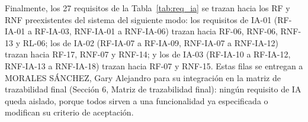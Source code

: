 \documentclass[journal,onecolumn]{IEEEtran}
\begin{document}
Finalmente, los 27 requisitos de la Tabla~\ref{tab:req_ia} se trazan hacia los RF y RNF
preexistentes del sistema del siguiente modo: los requisitos de IA-01 (RF-IA-01 a RF-IA-03,
RNF-IA-01 a RNF-IA-06) trazan hacia RF-06, RNF-06, RNF-13 y RL-06; los de IA-02 (RF-IA-07 a
RF-IA-09, RNF-IA-07 a RNF-IA-12) trazan hacia RF-17, RNF-07 y RNF-14; y los de IA-03 (RF-IA-10 a
RF-IA-12, RNF-IA-13 a RNF-IA-18) trazan hacia RF-07 y RNF-15. Estas filas se entregan a
MORALES SÁNCHEZ, Gary Alejandro para su integración en la matriz de trazabilidad final
(Sección 6, Matriz de trazabilidad final): ningún requisito de IA queda aislado, porque todos sirven a
una funcionalidad ya especificada o modifican su criterio de aceptación.

	
	\newpage
\end{document}
